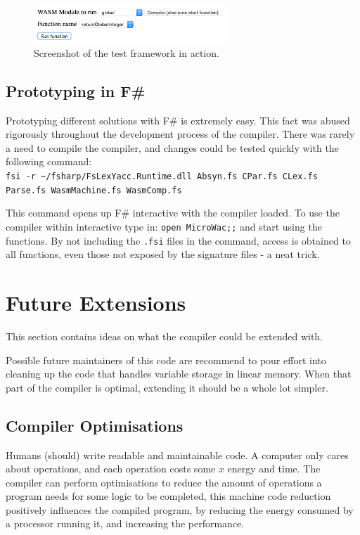 \documentclass[a4paper]{article}
\begin{document}
\begin{figure}[H]
	\includegraphics[width=0.65\textwidth]{WasmTestFrameworkScreenshot}
	\centering
	\caption{Screenshot of the test framework in action.}
\end{figure}

\subsection{Prototyping in F\#}
\label{sec:peripherals:prototyping}
Prototyping different solutions with F\# is extremely easy. This fact was abused rigorously throughout the development process of the compiler. There was rarely a need to compile the compiler, and changes could be tested quickly with the following command:\\
\texttt{fsi -r \textasciitilde/fsharp/FsLexYacc.Runtime.dll Absyn.fs CPar.fs CLex.fs Parse.fs WasmMachine.fs WasmComp.fs}

This command opens up F\# interactive with the compiler loaded. To use the compiler within interactive type in: \texttt{open MicroWac;;} and start using the functions. By not including the \texttt{.fsi} files in the command, access is obtained to all functions, even those not exposed by the signature files - a neat trick.

\newpage
\section{Future Extensions}
\label{sec:extensions}
This section contains ideas on what the compiler could be extended with.

Possible future maintainers of this code are recommend to pour effort into cleaning up the code that handles variable storage in linear memory. When that part of the compiler is optimal, extending it should be a whole lot simpler.

\subsection{Compiler Optimisations}
\label{sec:extensions:optimisations}
Humans (should) write readable and maintainable code. A computer only cares about operations, and each operation costs some $x$ energy and time. The compiler can perform optimisations to reduce the amount of operations a program needs for some logic to be completed, this machine code reduction positively influences the compiled program, by reducing the energy consumed by a processor running it, and increasing the performance.
\end{document}
